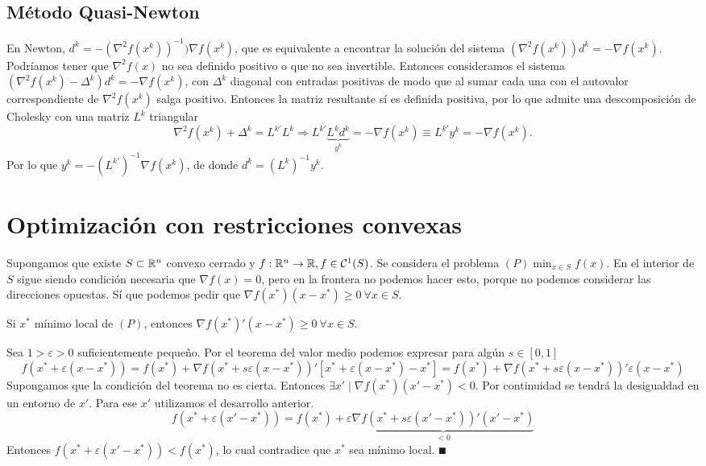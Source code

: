 \documentclass[MIOP.tex]{subfiles}
\begin{document}
\subsection{Método Quasi-Newton}
En Newton, $d^k=-(\nabla^2 f(x^k))^{-1})\nabla f(x^k)$, que es equivalente a encontrar la solución del sistema $(\nabla^2 f(x^k))d^k=-\nabla f(x^k)$.  Podríamos tener que $\nabla^2 f(x)$ no sea definido positivo o que no sea invertible. Entonces consideramos el sistema $(\nabla^2 f(x^k)-\Delta^k)d^k=-\nabla f(x^k)$, con $\Delta^k$ diagonal con entradas positivas de modo que al sumar cada una con el autovalor correspondiente de $\nabla^2 f(x^k)$ salga positivo. Entonces la matriz resultante sí es definida positiva, por lo que admite una descomposición de Cholesky con una matriz $L^k$ triangular
$$\nabla^2 f(x^k)+\Delta^k=L^{k'}L^k\Rightarrow L^{k'}\underbrace{L^kd^k}_{y^k}=-\nabla f(x^k)\equiv L^{k'}y^k=-\nabla f(x^k).$$
Por lo que $y^k=-(L^{k'})^{-1}\nabla f(x^k)$, de donde $d^k=(L^k)^{-1}y^k$.
\section{Optimización con restricciones convexas}
Supongamos que existe $S\subset\mathbb{R}^n$ convexo cerrado y $f:\mathbb{R}^n\to\mathbb{R}, f\in\mathcal{C}^1(S)$. Se considera el problema $(P)\min_{x\in S} f(x)$. En el interior de $S$ sigue siendo condición necesaria que $\nabla f(x)=0$, pero en la frontera no podemos hacer esto, porque no podemos considerar las direcciones opuestas. Sí que podemos pedir que $\nabla f(x^*)(x-x^*)\geq 0\ \forall x\in S$. 
\begin{teorema}
Si $x^*$ mínimo local de $(P)$, entonces  $\nabla f(x^*)'(x-x^*)\geq 0\ \forall x\in S$.
\end{teorema}
\begin{dem}
Sea $1>\varepsilon>0$ suficientemente pequeño. Por el teorema del valor medio podemos expresar para algún $s\in[0,1]$
$$f(x^*+\varepsilon(x-x^*))=f(x^*)+\nabla f(x^*+s\varepsilon (x-x^*))'[x^*+\varepsilon(x-x^*)-x^*]=f(x^*)+\nabla f(x^*+s\varepsilon (x-x^*))'\varepsilon(x-x^*)$$
Supongamos que la condición del teorema no es cierta. Entonces $\exists x'\mid \nabla f(x^*)(x'-x^*)<0$. Por continuidad se tendrá la desigualdad en un entorno de $x'$. Para ese $x'$ utilizamos el desarrollo anterior. 
$$f(x^*+\varepsilon(x'-x^*))=f(x^*)+\varepsilon\underbrace{\nabla  f(x^*+s\varepsilon (x'-x^*))'(x'-x^*)}_{<0}$$
Entonces $f(x^*+\varepsilon(x'-x^*))< f(x^*)$, lo cual contradice que $x^*$ sea mínimo local. $\QED$
\end{dem}
\end{document}
